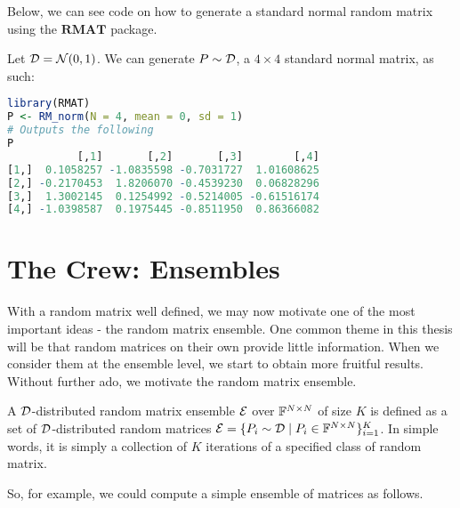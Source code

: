 Below, we can see code on how to generate a standard normal random matrix using the $\textbf{RMAT}$ package.

\begin{code}
Let $\mathcal{D} = \mathcal{N}(0,1)$. We can generate $P \sim \mathcal{D}$, a $4 \times 4$ standard normal matrix, as such:
\end{code}

\begin{lstlisting}[language=R]
library(RMAT)
P <- RM_norm(N = 4, mean = 0, sd = 1)
# Outputs the following
P
           [,1]       [,2]       [,3]        [,4]
[1,]  0.1058257 -1.0835598 -0.7031727  1.01608625
[2,] -0.2170453  1.8206070 -0.4539230  0.06828296
[3,]  1.3002145  0.1254992 -0.5214005 -0.61516174
[4,] -1.0398587  0.1975445 -0.8511950  0.86366082
\end{lstlisting}

\Ddisttable
\newpage


\section{The Crew: Ensembles}

With a random matrix well defined, we may now motivate one of the most important ideas - the random matrix ensemble. One common theme in this thesis will be that random matrices on their own provide little information. When we consider them at the ensemble level, we start to obtain more fruitful results. Without further ado, we motivate the random matrix ensemble.

\begin{definition}
A $\mathcal{D}$-distributed random matrix ensemble $\mathcal{E}$ over $\mathbb{F}^{N \times N}$ of size $K$ is defined as a set of $\mathcal{D}$-distributed random matrices $\mathcal{E} = \{P_i \sim \mathcal{D} \mid P_i \in \mathbb{F}^{N \times N}\}_{i = 1}^K$. In simple words, it is simply a collection of $K$ iterations of a specified class of random matrix.
\end{definition}

So, for example, we could compute a simple ensemble of matrices as follows.

